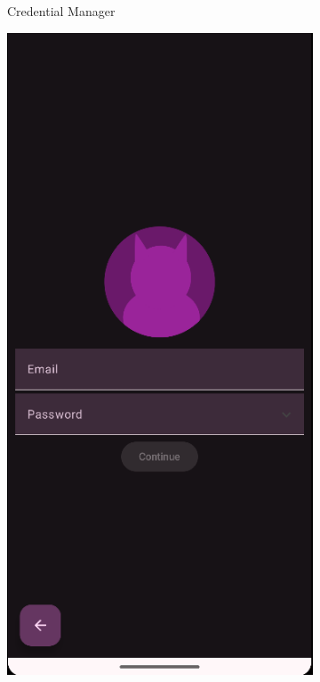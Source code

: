 \documentclass{report}
\begin{document}
\begin{figure}[h]
\begin{subfigure}[b]{0.32\textwidth}
        \caption{Credential Manager}
    \end{subfigure}
    \hfill
    \begin{subfigure}[b]{0.32\textwidth}
        \includegraphics[width=\textwidth]{DEMO_Reg1.png} 

\end{subfigure}
\end{figure}
\end{document}
